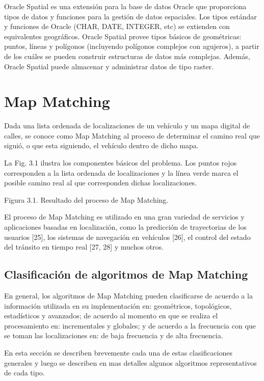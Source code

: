 \documentclass[final,fmstyle]{fpunathesis}
\begin{document}
Oracle Spatial es una extensión para la base de datos Oracle que proporciona tipos de datos y funciones para la gestión de datos espaciales. Los tipos estándar y funciones de Oracle (CHAR, DATE, INTEGER, etc) se extienden con equivalentes geográficos. Oracle Spatial provee tipos básicos de geométricas: puntos, líneas y polígonos (incluyendo polígonos complejos con agujeros), a partir de los cuáles se pueden construir estructuras de datos más complejas. Además, Oracle Spatial puede almacenar y administrar datos de tipo raster.



\chapter{Map Matching}

Dada una lista ordenada de localizaciones de un vehículo y un mapa digital de calles, se conoce como Map Matching al proceso de determinar el camino real que siguió, o que esta siguiendo, el vehículo dentro de dicho mapa.

La Fig. 3.1 ilustra los componentes básicos del problema. Los puntos rojos corresponden a la lista ordenada de localizaciones y la línea verde marca el posible camino real al que corresponden dichas localizaciones.

Figura 3.1. Resultado del proceso de Map Matching.

El proceso de Map Matching es utilizado en una gran variedad de servicios y aplicaciones basadas en localización, como la predicción de trayectorias de los usuarios [25], los sistemas de navegación en vehículos [26], el control del estado del tránsito en tiempo real [27, 28] y muchos otros.

\section{Clasificación de algoritmos de Map Matching}

En general, los algoritmos de Map Matching pueden clasificarse de acuerdo a la información utilizada en su implementación en: geométricos, topológicos, estadísticos y avanzados; de acuerdo al momento en que se realiza el procesamiento en: incrementales y globales; y de acuerdo a la frecuencia con que se toman las localizaciones en: de baja frecuencia y de alta frecuencia.

En esta sección se describen brevemente cada una de estas clasificaciones generales y luego se describen en mas detalles algunos algoritmos representativos de cada tipo.
\end{document}
